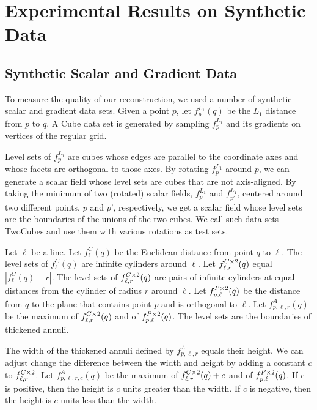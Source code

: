 
\newcommand{\fCII} {\emath{f^{C \times 2}}}
\newcommand{\fPII} {\emath{f^{P \times 2}}}
\section{Experimental Results on Synthetic Data}\label{sec:synData}
\label{section:results}

\subsection{Synthetic Scalar and Gradient Data}
\label{section:synthetic}

To measure the quality of our reconstruction,
we used a number of synthetic scalar and gradient data sets.
Given a point $p$,
let $f^{L_1}_{p}(q)$ be the $L_1$ distance from $p$ to $q$.
A Cube data set is generated by sampling $f^{L_1}_p$
and its gradients on vertices of the regular grid.

Level sets of $f^{L_1}_p$ are cubes whose edges are
parallel to the coordinate axes
and whose facets are orthogonal to those axes.
By rotating $f^{L_1}_p$ around $p$, 
we can generate a scalar field whose level sets are cubes
that are not axis-aligned.
By taking the minimum of two (rotated) scalar fields, 
$f^{L_1}_p$ and $f^{L_1}_{p'}$, 
centered around two different points, $p$ and $p$', respectively,
we get a scalar field whose level sets are the boundaries
of the unions of the two cubes.
We call such data sets TwoCubes and use them 
with various rotations as test sets.

Let $\ell$ be a line.
Let $f^C_{\ell}(q)$ be the Euclidean distance from point $q$ to $\ell$.
The level sets of $f^C_{\ell}(q)$ are infinite cylinders around $\ell$.
Let $\fCII_{\ell,r}(q)$ equal $|f^C_{\ell}(q) - r|$.
The level sets of $\fCII_{\ell,r}(q)$  are pairs of infinite cylinders
at equal distances from the cylinder of radius $r$ around $\ell$.
Let $\fPII_{p,\ell}(q)$ be the distance from $q$ to the plane 
that contains point $p$ and is orthogonal to $\ell$.
Let $f^A_{p,\ell,r}(q)$ be the maximum 
of $\fCII_{\ell,r}(q)$ and of $\fPII_{p,\ell}(q)$.
The level sets are the boundaries of thickened annuli.

The width of the thickened annuli defined by $f^A_{p,\ell,r}$
equals their height.
We can adjust change the difference between the width and height
by adding a constant $c$ to $\fCII_{\ell,r}$.
Let $f^A_{p,\ell,r,c}(q)$ be the maximum 
of $\fCII_{\ell,r}(q)+c$ and of $\fPII_{p,\ell}(q)$.
If $c$ is positive, then the height is $c$ units greater than the width.
If $c$ is negative, then the height is $c$ units less than the width.

